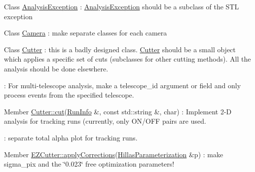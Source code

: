 \label{todo__todo000011}
\hypertarget{todo__todo000011}{}
 
\begin{DoxyDescription}
\item[Class \hyperlink{classAnalysisException}{AnalysisException} ]: \hyperlink{classAnalysisException}{AnalysisException} should be a subclass of the STL exception 
\end{DoxyDescription}

\label{todo__todo000001}
\hypertarget{todo__todo000001}{}
 
\begin{DoxyDescription}
\item[Class \hyperlink{classCamera}{Camera} ]: make separate classes for each camera 
\end{DoxyDescription}

\label{todo__todo000006}
\hypertarget{todo__todo000006}{}
 
\begin{DoxyDescription}
\item[Class \hyperlink{classCutter}{Cutter} ]: this is a badly designed class. \hyperlink{classCutter}{Cutter} should be a small object which applies a specific set of cuts (subclasses for other cutting methods). All the analysis should be done elsewhere.

: For multi-\/telescope analysis, make a telescope\_\-id argument or field and only process events from the specified telescope. 
\end{DoxyDescription}

\label{todo__todo000004}
\hypertarget{todo__todo000004}{}
 
\begin{DoxyDescription}
\item[Member \hyperlink{classCutter_a5c8d71e05e508ec60db78436b4ba416d}{Cutter::cut}(\hyperlink{classRunInfo}{RunInfo} \&, const std::string \&, char) ]: Implement 2-\/D analysis for tracking runs (currently, only ON/OFF pairs are used.

: separate total alpha plot for tracking runs.
\end{DoxyDescription}

\label{todo__todo000012}
\hypertarget{todo__todo000012}{}
 
\begin{DoxyDescription}
\item[Member \hyperlink{classEZCutter_adfef095f257966676350821591df66ed}{EZCutter::applyCorrections}(\hyperlink{structHillasParameterization}{HillasParameterization} \&p) ]: make sigma\_\-pix and the \char`\"{}0.023\char`\"{} free optimization parameters! 
\end{DoxyDescription}

